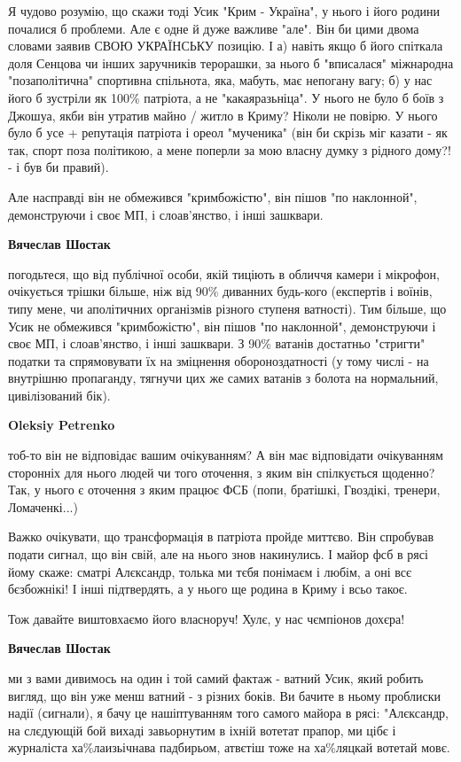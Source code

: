\begin{itemize}
\begin{itemize}
Я чудово розумію, що скажи тоді Усик "Крим - Україна", у нього і його родини
почалися б проблеми. Але є одне й дуже важливе "але". Він би цими двома словами
заявив СВОЮ УКРАЇНСЬКУ позицію. І а) навіть якщо б його спіткала доля Сенцова
чи інших заручників терорашки, за нього б "вписалася" міжнародна
"позаполітична" спортивна спільнота, яка, мабуть, має непогану вагу; б) у нас
його б зустріли як 100\% патріота, а не "какаяразьніца". У нього не було б боїв
з Джошуа, якби він утратив майно / житло в Криму? Ніколи не повірю. У нього
було б усе + репутація патріота і ореол "мученика" (він би скрізь міг казати -
як так, спорт поза політикою, а мене поперли за мою власну думку з рідного
дому?! - і був би правий).

Але насправді він не обмежився "кримбожістю", він пішов "по наклонной",
демонструючи і своє МП, і слоав'янство, і інші зашквари.

\textbf{Вячеслав Шостак} 

погодьтеся, що від публічної особи, якій тиціють в обличчя камери і мікрофон,
очікується трішки більше, ніж від 90\% диванних будь-кого (експертів і воїнів,
типу мене, чи аполітичних організмів різного ступеня ватності). Тим більше, що
Усик не обмежився "кримбожістю", він пішов "по наклонной", демонструючи і своє
МП, і слоав'янство, і інші зашквари. З 90\% ватанів достатньо "стригти" податки
та спрямовувати їх на зміцнення обороноздатності (у тому числі - на внутрішню
пропаганду, тягнучи цих же самих ватанів з болота на нормальний, цивілізований
бік).

\textbf{Oleksiy Petrenko} 

тоб-то він не відповідає вашим очікуванням? А він має відповідати очікуванням
сторонніх для нього людей чи того оточення, з яким він спілкується щоденно?
Так, у нього є оточення з яким працює ФСБ (попи, братішкі, Гвоздікі, тренери,
Ломаченкі...)

Важко очікувати, що трансформація в патріота пройде миттєво. Він спробував
подати сигнал, що він свій, але на нього знов накинулись. І майор фсб в рясі
йому скаже: сматрі Алєксандр, толька ми тєбя понімаєм і любім, а оні всє
бєзбожнікі! І інші підтвердять, а у нього ще родина в Криму і всьо такоє.

Тож давайте виштовхаємо його власноруч! Хулє, у нас чємпіонов дохєра!

\textbf{Вячеслав Шостак} 

ми з вами дивимось на один і той самий фактаж - ватний Усик, який робить
вигляд, що він уже менш ватний - з різних боків. Ви бачите в ньому проблиски
надії (сигнали), я бачу це нашіптуванням того самого майора в рясі: "Алєксандр,
на слєдующій бой вихаді завьорнутим в іхній вотетат прапор, ми цібє і
журналіста ха\%лаизьічнава падбирьом, атвєтіш тоже на ха\%ляцкай вотетай мовє.


\end{itemize}
\end{itemize}
